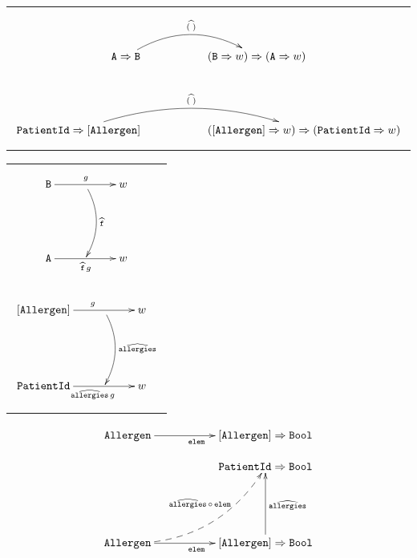 \documentclass[multi=page,margin=1cm,crop]{standalone}
\begin{document}
\begin{page}
  \begin{tabular}{c}
    $$
    \xymatrix{
      \\
      \Fun{\A}{\B}
        \ar@/^2em/[rr]^{\preap{(\;)}}
      &
      & \Fun{(\Fun{\B}{w})}{(\Fun{\A}{w})}
    }
    $$
  \\
  \\
    $$
    \xymatrix{
      \\
      \Fun{\PatientId}{[\Allergen]}
        \ar@/^2em/[rr]^{\preap{(\;)}}
      &
      & \Fun{(\Fun{[\Allergen]}{w})}{(\Fun{\PatientId}{w})}
    }
    $$
  \end{tabular}
\end{page}

\begin{page}
  \begin{tabular}{c}
    $$
    \xymatrix{
      \B
        \ar[rr]^{g}
      &
        \ar@/^1em/[dd]^{\preap{\f}}
      & w
      \\
      \\ \A
        \ar[rr]_{\mathop{\preap{\f}} g}
      &
      & w
    }
    $$
  \\
  \\
    $$
    \xymatrix{
      [\Allergen]
        \ar[rr]^{g}
      &
        \ar@/^1em/[dd]^{\preap{\allergies}}
      & w
      \\
      \\ \PatientId
        \ar[rr]_{\mathop{\preap{\allergies}} g}
      &
      & w
    }
    $$
  \end{tabular}
\end{page}

\begin{page}
  $$
  \xymatrix{
    \Allergen
      \ar[rr]_{\elem}
    &
    & \Fun{[\Allergen]}{\Bool}
  }
  $$
\end{page}

\begin{page}
  $$
  \xymatrix{
    &
    & \Fun{\PatientId}{\Bool}
    \\
    \\ \Allergen
      \ar@{-->}@/_2em/[uurr]^(0.65){\preap{\allergies} \comp \elem}
      \ar[rr]_{\elem}
    &
    & \Fun{[\Allergen]}{\Bool}
      \ar[uu]_{\preap{\allergies}}
  }
  $$
\end{page}
\end{document}
